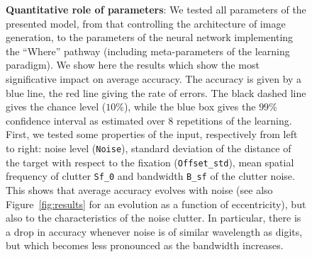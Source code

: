 \begin{figure}[t!]%
\caption{
{\bf Quantitative role of parameters}:
We tested all parameters of the presented model, from that controlling the architecture of image generation, to the parameters of the neural network implementing the ``Where'' pathway (including meta-parameters of the learning paradigm). We show here the results which show the most significative impact on average accuracy.
The accuracy is given by a blue line, the red line giving the rate of errors. The black dashed line gives the chance level ($10\%$), while the blue box gives the $99\%$ confidence interval as estimated over $8$ repetitions of the learning. %
\A First, we tested some properties of the input, respectively from left to right: noise level (\texttt{Noise}), standard deviation  of the distance of the target with respect to the fixation (\texttt{Offset\_std}), mean spatial frequency of clutter \texttt{Sf\_0} and bandwidth \texttt{B\_sf} of the clutter noise. This shows that average accuracy evolves with noise (see also Figure~\ref{fig:results} for an evolution as a function of eccentricity), but also to the characteristics of the noise clutter. In particular, there is a drop in accuracy whenever noise is of similar wavelength as digits, but which becomes less pronounced as the bandwidth increases. %
}
\end{figure}
